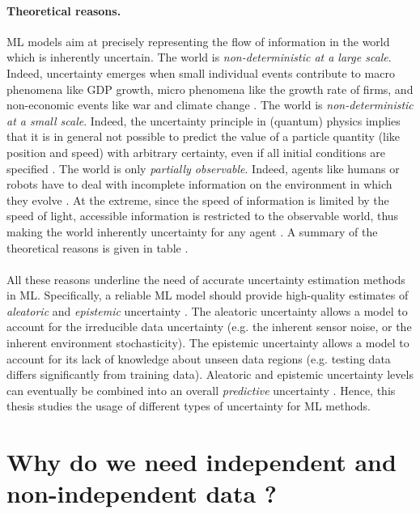 \paragraph*{Theoretical reasons.} ML models aim at precisely representing the flow of information in the world which is inherently uncertain.
The world is \emph{non-deterministic at a large scale}. Indeed, uncertainty emerges when small individual events contribute to macro phenomena like GDP growth, micro phenomena like the growth rate of firms, and non-economic events like war and climate change \cite{macro-micro-uncertainty}.
The world is \emph{non-deterministic at a small scale}. Indeed, the uncertainty principle in (quantum) physics implies that it is in general not possible to predict the value of a particle quantity (like position and speed) with arbitrary certainty, even if all initial conditions are specified \cite{hilgevoord2016heisenberg}.
The world is only \emph{partially observable}. Indeed, agents like humans or robots have to deal with incomplete information on the environment in which they evolve \cite{kaelbling1998pomdp}. At the extreme, since the speed of information is limited by the speed of light, accessible information is restricted to the observable world, thus making the world inherently uncertainty for any agent \cite{ord2021universe}.
A summary of the theoretical reasons is given in table .

\paragraph*{} All these reasons underline the need of accurate uncertainty estimation methods in ML. 
Specifically, a reliable ML model should provide high-quality estimates of \emph{aleatoric} and \emph{epistemic} uncertainty \citep{uncertainty-deep-learning}.
The aleatoric uncertainty allows a model to account for the irreducible data uncertainty (e.g. the inherent sensor noise, or the inherent environment stochasticity).
The epistemic uncertainty allows a model to account for its lack of knowledge about unseen data regions (e.g. testing data differs significantly from training data).
Aleatoric and epistemic uncertainty levels can eventually be combined into an overall \emph{predictive} uncertainty \citep{uncertainty-deep-learningout}. Hence, this thesis studies the usage of different types of uncertainty for ML methods.

\section{Why do we need independent and non-independent data ?}

